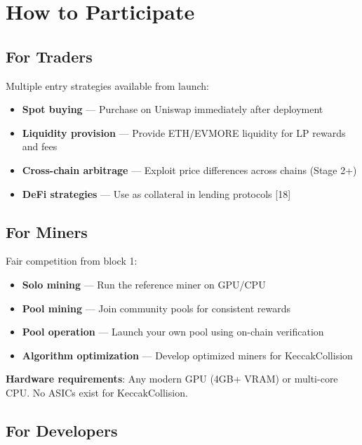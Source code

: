 \documentclass[11pt,a4paper]{article}
\begin{document}
\section{How to Participate}

\subsection{For Traders}

Multiple entry strategies available from launch:

\begin{itemize}
    \item \textbf{Spot buying} --- Purchase on Uniswap immediately after deployment
    \item \textbf{Liquidity provision} --- Provide ETH/EVMORE liquidity for LP rewards and fees
    \item \textbf{Cross-chain arbitrage} --- Exploit price differences across chains (Stage 2+)
    \item \textbf{DeFi strategies} --- Use as collateral in lending protocols [18]
\end{itemize}

\subsection{For Miners}

Fair competition from block 1:

\begin{itemize}
    \item \textbf{Solo mining} --- Run the reference miner on GPU/CPU
    \item \textbf{Pool mining} --- Join community pools for consistent rewards
    \item \textbf{Pool operation} --- Launch your own pool using on-chain verification
    \item \textbf{Algorithm optimization} --- Develop optimized miners for KeccakCollision
\end{itemize}

\noindent \textbf{Hardware requirements}: Any modern GPU (4GB+ VRAM) or multi-core CPU. No ASICs exist for KeccakCollision.

\subsection{For Developers}
\end{document}
